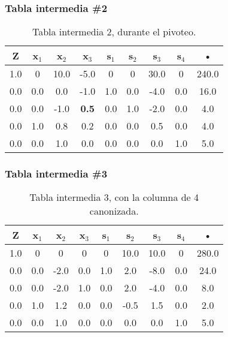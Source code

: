 \documentclass{beamer}
\begin{document}
 
\begin{frame}  
\frametitle{Tabla intermedia \#2} 
\begin{table}[H] 
\begin{center} 
\begin{tabular}{|*{9}{c|}} 
\hline 
\textbf{Z}  & \textbf{x$_{1}$} & \textbf{x$_{2}$} & \cellcolor{color_columna_candidata}\textcolor{color_blanco}{\textbf{x$_{3}$}} & \textbf{s$_{1}$} & \textbf{s$_{2}$} & \textbf{s$_{3}$} & \textbf{s$_{4}$} & \textbf{•} \\\hline \hline 
1.0 & 0 & 10.0 & \cellcolor{color_columna_candidata}\textcolor{color_blanco}{-5.0} & 0 & 0 & 30.0 & 0 & 240.0 \\\hline 
0.0 & 0.0 & 0.0 & \cellcolor{color_columna_candidata}\textcolor{color_blanco}{-1.0} & 1.0 & 0.0 & -4.0 & 0.0 & 16.0\\ 
\hline 
0.0 & 0.0 & -1.0 & \cellcolor{color_pivote}\textbf{0.5} & 0.0 & 1.0 & -2.0 & 0.0 & 4.0\\ 
\hline 
0.0 & 1.0 & 0.8 & \cellcolor{color_columna_candidata}\textcolor{color_blanco}{0.2} & 0.0 & 0.0 & 0.5 & 0.0 & 4.0\\ 
\hline 
0.0 & 0.0 & 1.0 & \cellcolor{color_columna_candidata}\textcolor{color_blanco}{0.0} & 0.0 & 0.0 & 0.0 & 1.0 & 5.0\\ 
\hline 
\end{tabular} 
\caption{Tabla intermedia 2, durante el pivoteo.} 
\end{center} 
\end{table} 
\end{frame} 
 
 
\begin{frame}  
\frametitle{Tabla intermedia \#3} 
\begin{table}[H] 
\begin{center} 
\begin{tabular}{|*{9}{c|}} 
\hline 
\textbf{Z}  & \textbf{x$_{1}$} & \textbf{x$_{2}$} & \cellcolor{color_columna_candidata}\textcolor{color_blanco}{\textbf{x$_{3}$}} & \textbf{s$_{1}$} & \textbf{s$_{2}$} & \textbf{s$_{3}$} & \textbf{s$_{4}$} & \textbf{•} \\\hline \hline 
1.0 & 0 & 0 & \cellcolor{color_columna_candidata}\textcolor{color_blanco}{0} & 0 & 10.0 & 10.0 & 0 & 280.0 \\\hline 
0.0 & 0.0 & -2.0 & \cellcolor{color_columna_candidata}\textcolor{color_blanco}{0.0} & 1.0 & 2.0 & -8.0 & 0.0 & 24.0\\ 
\hline 
0.0 & 0.0 & -2.0 & \cellcolor{color_columna_candidata}\textcolor{color_blanco}{1.0} & 0.0 & 2.0 & -4.0 & 0.0 & 8.0\\ 
\hline 
0.0 & 1.0 & 1.2 & \cellcolor{color_columna_candidata}\textcolor{color_blanco}{0.0} & 0.0 & -0.5 & 1.5 & 0.0 & 2.0\\ 
\hline 
0.0 & 0.0 & 1.0 & \cellcolor{color_columna_candidata}\textcolor{color_blanco}{0.0} & 0.0 & 0.0 & 0.0 & 1.0 & 5.0\\ 
\hline 
\end{tabular} 
\caption{Tabla intermedia 3, con la columna de 4 canonizada.} 
\end{center} 
\end{table} 
\end{frame} 
 
\end{document}
